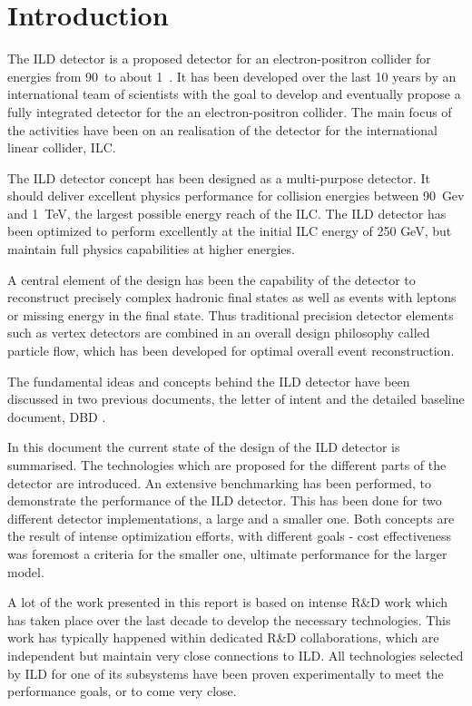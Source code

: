 \chapter{Introduction}
The ILD detector is a proposed detector for an electron-positron collider for energies from 90~\GeV to about 1~\TeV. It has been developed over the last 10 years by an international team of scientists with the goal to develop and eventually propose a fully integrated detector for the an electron-positron collider. The main focus of the activities have been on an realisation of the detector for the international linear collider, ILC.

The ILD detector concept has been designed as a multi-purpose detector. It should deliver excellent physics performance for collision energies between 90~Gev and 1~TeV, the largest possible energy reach of the ILC. The ILD detector has been optimized to perform excellently at the initial ILC energy of 250 GeV, but maintain full physics capabilities at higher energies.

 A central element of the design has been the capability of the detector to reconstruct precisely complex hadronic final states as well as events with leptons or missing energy in the final state. Thus traditional precision detector elements such as vertex detectors are combined in an overall design philosophy called particle flow, which has been developed for optimal overall event reconstruction.

The fundamental ideas and concepts behind the ILD detector have been discussed in two previous documents, the letter of intent \cite{ild:bib:ILDloi} and the detailed baseline document, DBD \cite{ild:bib:ILDDBD}. 

In this document the current state of the design of the ILD detector is summarised. The technologies which are proposed for the different parts of the detector are introduced. An extensive benchmarking has been performed, to demonstrate the performance of the ILD detector. This has been done for two different detector implementations, a large and a smaller one. Both concepts are the result of intense optimization efforts, with different goals - cost effectiveness was foremost a criteria for the smaller one, ultimate performance for the larger model. 

A lot of the work presented in this report is based on intense R\&D work which has taken place over the last decade to develop the necessary technologies. 
This work has typically happened within dedicated R\&D collaborations, which are independent but maintain very close connections to ILD. All technologies selected by ILD for one of its subsystems have been proven experimentally to meet the performance goals, or to come very close. 

